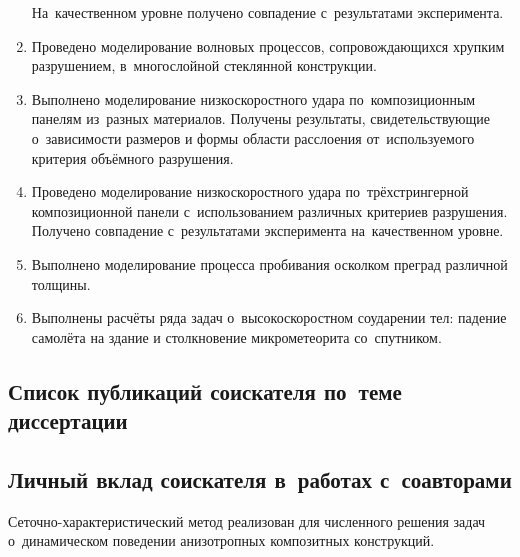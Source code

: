 \documentclass[a4paper,14pt]{extarticle}
\numberwithin{equation}{section}
\begin{document}
\begin{enumerate}
              На~качественном уровне получено совпадение с~результатами эксперимента.
        \item Проведено моделирование волновых процессов, сопровождающихся хрупким разрушением, в~многослойной
              стеклянной конструкции.
        \item Выполнено моделирование низкоскоростного удара по~композиционным панелям из~разных материалов. Получены
              результаты, свидетельствующие о~зависимости размеров и формы области расслоения от~используемого критерия
              объёмного разрушения.
        \item Проведено моделирование низкоскоростного удара по~трёхстрингерной композиционной панели с~использованием
              различных критериев разрушения. Получено совпадение с~результатами эксперимента на~качественном уровне.
        \item Выполнено моделирование процесса пробивания осколком преград различной толщины.
        \item Выполнены расчёты ряда задач о~высокоскоростном соударении тел: падение самолёта на
              здание и столкновение микрометеорита со~спутником.

    \end{enumerate}

    \subsection*{Список публикаций соискателя по~теме диссертации}
        \nocite{беклемышева2013численное,васюков2014комбинирование,петров2014схм,petrov2014combined,петров2014численный,петров2015комбинированный,беклемышева2014численное,беклемышева2012численное,ермаков2013построение,беклемышева2013численное2,беклемышева2013численное3}
        \begingroup
            \renewcommand{\section}[2]{}%
            
        \endgroup

    \subsection*{Личный вклад соискателя в~работах с~соавторами}

    Сеточно-характеристический метод реализован для численного решения задач о~динамическом поведении анизотропных
    композитных конструкций.
\end{document}

